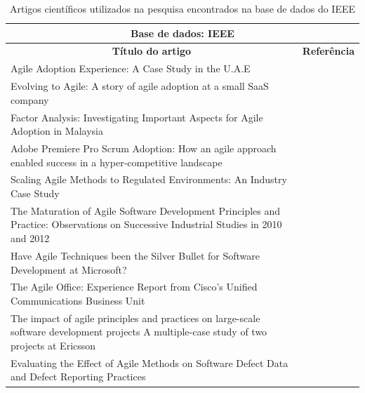 \begin{table}[h]
	\centering
	\captionsetup{justification=centering,margin=1cm}
	\begin{tabularx}{\linewidth}{ | X | p{3cm} | } \hline \multicolumn{2}{|c|}{\textbf{Base de dados: IEEE}} \\ \hline
	\multicolumn{1}{|c|}{\textbf{Título do artigo}} & \multicolumn{1}{|c|}{\textbf{Referência}} \\ \hline
		Agile Adoption Experience: A Case Study in the U.A.E & \cite{Hajjdiab2011} \\ \hline
		Evolving to Agile: A story of agile adoption at a small SaaS company & \cite{Block2011} \\ \hline
		Factor Analysis: Investigating Important Aspects for Agile Adoption in Malaysia & \cite{Asnawi2012} \\ \hline
		Adobe Premiere Pro Scrum Adoption: How an agile approach enabled success in a hyper-competitive landscape & \cite{Adobe2012} \\ \hline
		Scaling Agile Methods to Regulated Environments: An Industry Case Study & \cite{Fitzgerald2013} \\ \hline
		The Maturation of Agile Software Development Principles and Practice: Observations on Successive Industrial Studies in 2010 and 2012 & \cite{Bustard2013} \\ \hline
		Have Agile Techniques been the Silver Bullet for Software Development at Microsoft? & \cite{Microsoft2013} \\ \hline
		The Agile Office: Experience Report from Cisco’s Unified Communications Business Unit & \cite{Cisco2011} \\ \hline
		The impact of agile principles and practices on large-scale software development projects A multiple-case study of two projects at Ericsson & \cite{Ericsson2013} \\ \hline
		Evaluating the Effect of Agile Methods on Software Defect Data and Defect Reporting Practices & \cite{Korhonen2010} \\ \hline
	\end{tabularx}
	\caption{Artigos científicos utilizados na pesquisa encontrados na base de dados do IEEE}
	\label{tab:artigosIEEE}
\end{table}

